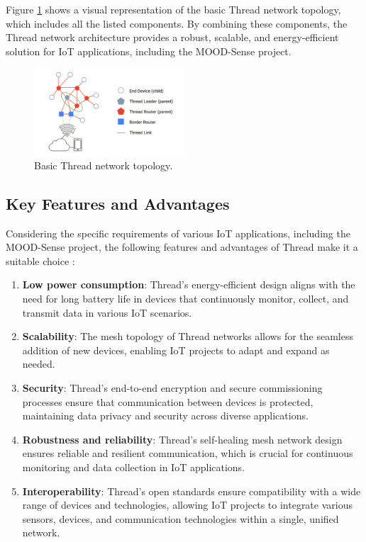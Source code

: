 Figure \ref{fig:thread_topology} shows a visual representation of the basic Thread network topology, which includes all the listed components. By combining these components, the Thread network architecture provides a robust, scalable, and energy-efficient solution for \gls{IoT} applications, including the MOOD-Sense project.

\begin{figure}[H]
    \centering
    \includegraphics[width=0.5\textwidth]{images/situational_theoretical_analysis/thread_topology.png}
    \caption{Basic Thread network topology.}
    \label{fig:thread_topology}
\end{figure}


\subsection{Key Features and Advantages}

Considering the specific requirements of various \gls{IoT} applications, including the MOOD-Sense project, the following features and advantages of Thread make it a suitable choice \cite{Thread_Group_Fundamentals}:

\begin{enumerate}
    \item \textbf{Low power consumption}: Thread's energy-efficient design aligns with the need for long battery life in devices that continuously monitor, collect, and transmit data in various \gls{IoT} scenarios.
    \item \textbf{Scalability}: The mesh topology of Thread networks allows for the seamless addition of new devices, enabling \gls{IoT} projects to adapt and expand as needed.
    \item \textbf{Security}: Thread's end-to-end encryption and secure commissioning processes ensure that communication between devices is protected, maintaining data privacy and security across diverse applications.
    \item \textbf{Robustness and reliability}: Thread's self-healing mesh network design ensures reliable and resilient communication, which is crucial for continuous monitoring and data collection in \gls{IoT} applications.
    \item \textbf{Interoperability}: Thread's open standards ensure compatibility with a wide range of devices and technologies, allowing \gls{IoT} projects to integrate various sensors, devices, and communication technologies within a single, unified network.
\end{enumerate}

